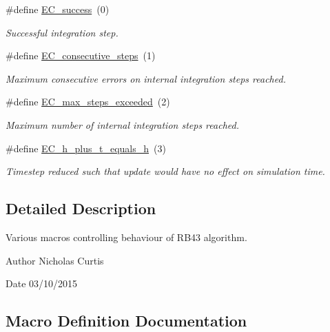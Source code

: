 \begin{DoxyCompactItemize}
\#define \hyperlink{group__exprb43cu__ErrCodes_gabd83bc0f9f475a2189a4db4a08b790ca}{E\+C\+\_\+success}~(0)
\begin{DoxyCompactList}\small\item\em Successful integration step. \end{DoxyCompactList}\item 
\#define \hyperlink{group__exprb43cu__ErrCodes_gae0287841c08f86f5709660fd731615ad}{E\+C\+\_\+consecutive\+\_\+steps}~(1)
\begin{DoxyCompactList}\small\item\em Maximum consecutive errors on internal integration steps reached. \end{DoxyCompactList}\item 
\#define \hyperlink{group__exprb43cu__ErrCodes_ga0f0275d9851ab5c19b79a963d5084df3}{E\+C\+\_\+max\+\_\+steps\+\_\+exceeded}~(2)
\begin{DoxyCompactList}\small\item\em Maximum number of internal integration steps reached. \end{DoxyCompactList}\item 
\#define \hyperlink{group__exprb43cu__ErrCodes_ga9326efd544880e2683c4453365ca2704}{E\+C\+\_\+h\+\_\+plus\+\_\+t\+\_\+equals\+\_\+h}~(3)
\begin{DoxyCompactList}\small\item\em Timestep reduced such that update would have no effect on simulation time. \end{DoxyCompactList}\end{DoxyCompactItemize}


\subsection{Detailed Description}
Various macros controlling behaviour of R\+B43 algorithm. 

\begin{DoxyAuthor}{Author}
Nicholas Curtis 
\end{DoxyAuthor}
\begin{DoxyDate}{Date}
03/10/2015 
\end{DoxyDate}


\subsection{Macro Definition Documentation}
